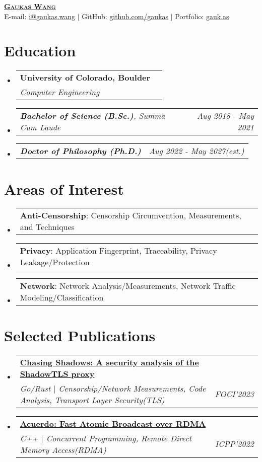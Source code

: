 \documentclass[letterpaper,11pt]{article}
\makeatletter
\newcommand{\resumeSubheading}[4]{
  \vspace{-2pt}\item
    \begin{tabular*}{0.97\textwidth}[t]{l@{\extracolsep{\fill}}r}
      \textbf{#1} & #2 \\
      \textit{\small#3} & \textit{\small #4} \\
    \end{tabular*}\vspace{-7pt}
}
\newcommand{\resumeSubSubheading}[2]{
    \item
    \begin{tabular*}{0.97\textwidth}{l@{\extracolsep{\fill}}r}
      \textit{\small#1} & \textit{\small #2} \\
    \end{tabular*}\vspace{-7pt}
}
\newcommand{\resumeProjectHeading}[2]{
    \item
    \begin{tabular*}{0.97\textwidth}{l@{\extracolsep{\fill}}r}
      \small#1 & #2 \\
    \end{tabular*}\vspace{-7pt}
}
\newcommand{\resumeSubHeadingListStart}{\begin{itemize}[leftmargin=0.15in, label={}]}
\newcommand{\resumeSubHeadingListEnd}{\end{itemize}}
\makeatother
\begin{document}
\begin{center}
  \href{https://gaukas.wang}{\textbf{\Huge \scshape Gaukas Wang}} \\ \vspace{1pt}
    E-mail: \href{mailto:i@gaukas.wang}{{i@gaukas.wang}} $|$ 
    GitHub: \href{https://github.com/gaukas}{{github.com/gaukas}} $|$ 
    Portfolio: \href{https://gauk.as}{gauk.as}
\end{center}


\section{Education}
\resumeSubHeadingListStart
\resumeSubheading
{University of Colorado, Boulder}{}
{Computer Engineering}{}
\resumeSubSubheading
{\textbf{Bachelor of Science (B.Sc.)}, {Summa Cum Laude}}{Aug 2018 - May 2021}
\resumeSubSubheading
{\textbf{Doctor of Philosophy (Ph.D.)}}{Aug 2022 - May 2027\textit{(est.)}}
\resumeSubHeadingListEnd

\vspace{1pt}

\section{Areas of Interest}
\resumeSubHeadingListStart

\resumeProjectHeading
{\textbf{Anti-Censorship}: Censorship Circumvention, Measurements, and Techniques}{}

\resumeProjectHeading
{\textbf{Privacy}: Application Fingerprint, Traceability, Privacy Leakage/Protection}{}

\resumeProjectHeading
{\textbf{Network}: Network Analysis/Measurements, Network Traffic Modeling/Classification}{}

\resumeSubHeadingListEnd
\vspace{1pt}

\section{Selected Publications}
\resumeSubHeadingListStart
  \resumeSubheading
  {\href{https://www.petsymposium.org/foci/2023/foci-2023-0002.php}{\textbf{Chasing Shadows: A security analysis of the ShadowTLS proxy}}}{}
  {Go/Rust $|$ Censorship/Network Measurements, Code Analysis, Transport Layer Security(TLS)}{FOCI'2023}
  \resumeSubheading
  {\href{https://dl.acm.org/doi/abs/10.1145/3545008.3545041}{\textbf{Acuerdo: Fast Atomic Broadcast over RDMA}}}{}
  {C++ $|$ Concurrent Programming, Remote Direct Memory Access(RDMA)}{ICPP'2022}
\resumeSubHeadingListEnd
\vspace{1pt}
\end{document}
